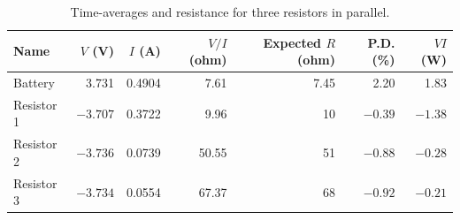%
\begin{table}[ht]
	\begin{center}
		\begin{tabular}{|l|r|r|r|r|r|r|}
			\hline
			Name & $V$ (V) & $I$ (A) & $V/I$ (ohm) & Expected $R$ (ohm) & P.D. (\%) & $V I$ (W) \\
			\hline
			Battery & 3.731 & 0.4904 & 7.61 & 7.45 & 2.20 & 1.83 \\
			Resistor 1 & $-3.707$ & 0.3722 & 9.96 & 10 & $-0.39$ & $-1.38$ \\
			Resistor 2 & $-3.736$ & 0.0739 & 50.55 & 51 & $-0.88$ & $-0.28$ \\
			Resistor 3 & $-3.734$ & 0.0554 & 67.37 & 68 & $-0.92$ & $-0.21$ \\
			\hline
		\end{tabular}
	\end{center}
	\caption{Time-averages and resistance for three resistors in parallel.}
	\label{table.03.3resistors.parallel}
\end{table}
%
\FloatBarrier
\newpage
